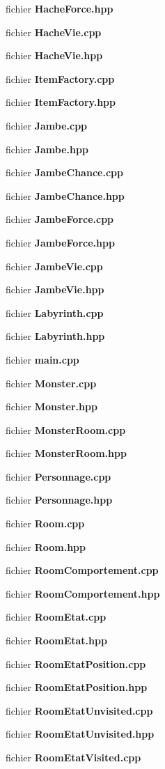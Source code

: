 \begin{DoxyCompactItemize}
fichier {\bf Hache\-Force.\-hpp}
\item 
fichier {\bf Hache\-Vie.\-cpp}
\item 
fichier {\bf Hache\-Vie.\-hpp}
\item 
fichier {\bf Item\-Factory.\-cpp}
\item 
fichier {\bf Item\-Factory.\-hpp}
\item 
fichier {\bf Jambe.\-cpp}
\item 
fichier {\bf Jambe.\-hpp}
\item 
fichier {\bf Jambe\-Chance.\-cpp}
\item 
fichier {\bf Jambe\-Chance.\-hpp}
\item 
fichier {\bf Jambe\-Force.\-cpp}
\item 
fichier {\bf Jambe\-Force.\-hpp}
\item 
fichier {\bf Jambe\-Vie.\-cpp}
\item 
fichier {\bf Jambe\-Vie.\-hpp}
\item 
fichier {\bf Labyrinth.\-cpp}
\item 
fichier {\bf Labyrinth.\-hpp}
\item 
fichier {\bf main.\-cpp}
\item 
fichier {\bf Monster.\-cpp}
\item 
fichier {\bf Monster.\-hpp}
\item 
fichier {\bf Monster\-Room.\-cpp}
\item 
fichier {\bf Monster\-Room.\-hpp}
\item 
fichier {\bf Personnage.\-cpp}
\item 
fichier {\bf Personnage.\-hpp}
\item 
fichier {\bf Room.\-cpp}
\item 
fichier {\bf Room.\-hpp}
\item 
fichier {\bf Room\-Comportement.\-cpp}
\item 
fichier {\bf Room\-Comportement.\-hpp}
\item 
fichier {\bf Room\-Etat.\-cpp}
\item 
fichier {\bf Room\-Etat.\-hpp}
\item 
fichier {\bf Room\-Etat\-Position.\-cpp}
\item 
fichier {\bf Room\-Etat\-Position.\-hpp}
\item 
fichier {\bf Room\-Etat\-Unvisited.\-cpp}
\item 
fichier {\bf Room\-Etat\-Unvisited.\-hpp}
\item 
fichier {\bf Room\-Etat\-Visited.\-cpp}
\item 

\end{DoxyCompactItemize}
